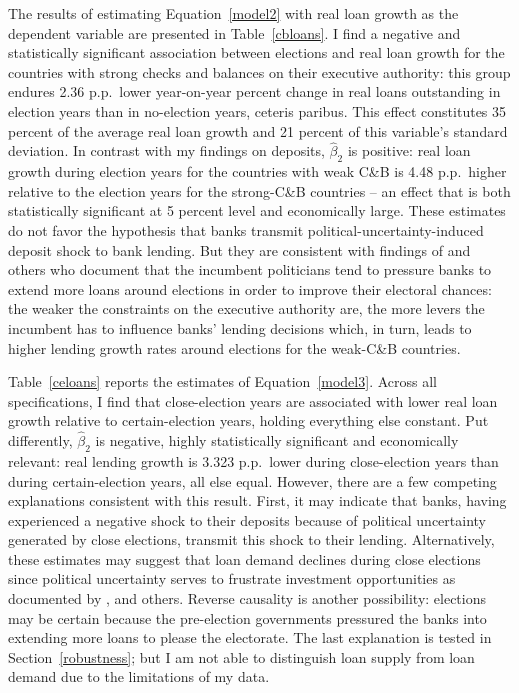\documentclass[12pt,a4paper]{article}
\begin{document}
The results of estimating Equation~\eqref{model2} with real loan growth as the dependent variable are presented in Table~\ref{cbloans}. I find a negative and statistically significant association between elections and real loan growth for the countries with strong checks and balances on their executive authority: this group endures 2.36 p.p.\ lower year-on-year percent change in real loans outstanding in election years than in no-election years, ceteris paribus. This effect constitutes 35 percent of the average real loan growth and 21 percent of this variable's standard deviation. In contrast with my findings on deposits, $\hat{\beta}_2$ is positive: real loan growth during election years for the countries with weak C\&B is 4.48 p.p.\ higher relative to the election years for the strong-C\&B countries -- an effect that is both statistically significant at 5 percent level and economically large. These estimates do not favor the hypothesis that banks transmit political-uncertainty-induced deposit shock to bank lending. But they are consistent with findings of \citet{dincc2005politicians} and others who document that the incumbent politicians tend to pressure banks to extend more loans around elections in order to improve their electoral chances: the weaker the constraints on the executive authority are, the more levers the incumbent has to influence banks' lending decisions which, in turn, leads to higher lending growth rates around elections for the weak-C\&B countries.



Table~\ref{celoans} reports the estimates of Equation~\eqref{model3}. Across all specifications, I find that close-election years are associated with lower real loan growth relative to certain-election years, holding everything else constant. Put differently, $\hat{\beta}_2$ is negative, highly statistically significant and economically relevant: real lending growth is 3.323 p.p.\ lower during close-election years than during certain-election years, all else equal. However, there are a few competing explanations consistent with this result. First, it may indicate that banks, having experienced a negative shock to their deposits because of political uncertainty generated by close elections, transmit this shock to their lending. Alternatively, these estimates may suggest that loan demand declines during close elections since political uncertainty serves to frustrate investment opportunities as documented by \citet{julio2012political}, \citet{jens2017political} and others. Reverse causality is another possibility: elections may be certain because the pre-election governments pressured the banks into extending more loans to please the electorate. The last explanation is tested in Section~\ref{robustness}; but I am not able to distinguish loan supply from loan demand due to the limitations of my data.
\end{document}

